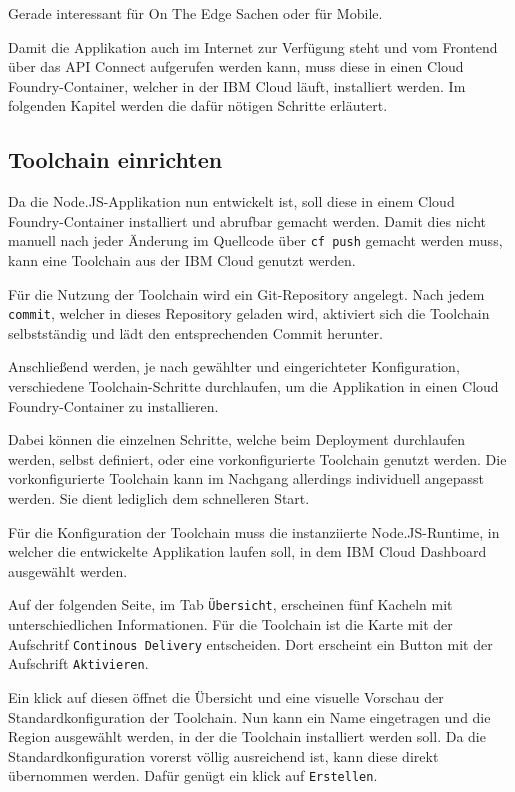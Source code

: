Gerade interessant für On The Edge Sachen oder für Mobile.

Damit die Applikation auch im Internet zur Verfügung steht und vom Frontend über das API Connect aufgerufen werden kann,
muss diese in einen Cloud Foundry-Container, welcher in der IBM Cloud läuft, installiert werden. Im folgenden Kapitel
werden die dafür nötigen Schritte erläutert.

\subsection{Toolchain einrichten}
Da die Node.JS-Applikation nun entwickelt ist, soll diese in einem Cloud Foundry-Container installiert und abrufbar
gemacht werden. Damit dies nicht manuell nach jeder Änderung im Quellcode über \texttt{cf push} gemacht werden muss, kann
eine Toolchain aus der IBM Cloud genutzt werden.

Für die Nutzung der Toolchain wird ein Git-Repository angelegt. Nach jedem \texttt{commit}, welcher in dieses Repository
geladen wird, aktiviert sich die Toolchain selbstständig und lädt den entsprechenden Commit herunter.

Anschließend werden, je nach gewählter und eingerichteter Konfiguration, verschiedene Toolchain-Schritte durchlaufen, um
die Applikation in einen Cloud Foundry-Container zu installieren.

Dabei können die einzelnen Schritte, welche beim Deployment durchlaufen werden, selbst definiert, oder eine
vorkonfigurierte Toolchain genutzt werden. Die vorkonfigurierte Toolchain kann im Nachgang allerdings individuell
angepasst werden. Sie dient lediglich dem schnelleren Start.

Für die Konfiguration der Toolchain muss die instanziierte Node.JS-Runtime, in welcher die entwickelte Applikation laufen
soll, in dem IBM Cloud Dashboard ausgewählt werden.

Auf der folgenden Seite, im Tab \texttt{Übersicht}, erscheinen fünf Kacheln mit unterschiedlichen Informationen. Für die
Toolchain ist die Karte mit der Aufschritf \texttt{Continous Delivery} entscheiden. Dort erscheint ein Button mit der
Aufschrift \texttt{Aktivieren}.

Ein klick auf diesen öffnet die Übersicht und eine visuelle Vorschau der Standardkonfiguration der Toolchain. Nun kann ein
Name eingetragen und die Region ausgewählt werden, in der die Toolchain installiert werden soll. Da die Standardkonfiguration
vorerst völlig ausreichend ist, kann diese direkt übernommen werden. Dafür genügt ein klick auf \texttt{Erstellen}.

